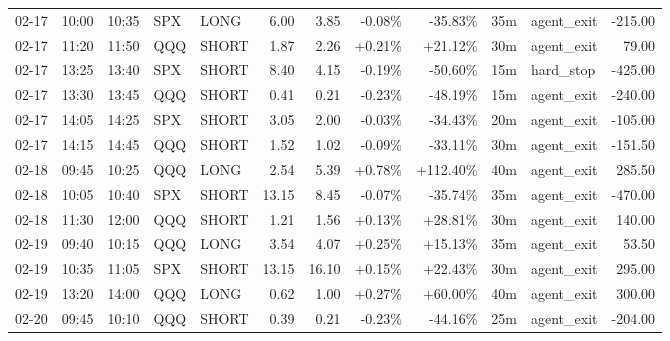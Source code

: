 \documentclass[11pt,a4paper,twoside]{article}
\begin{document}
\begin{center}
\begin{longtable}{>{\color{txtmain}}l l l l l r r r r r >{\color{txtmain}}l r}
02-17 & 10:00 & 10:35 & SPX & LONG & 6.00 & 3.85 & \textcolor{lossred}{-0.08\%} & \textcolor{lossred}{-35.83\%} & 35m & agent\_exit & \textcolor{lossred}{-215.00} \\
02-17 & 11:20 & 11:50 & QQQ & SHORT & 1.87 & 2.26 & \textcolor{wingreen}{+0.21\%} & \textcolor{wingreen}{+21.12\%} & 30m & agent\_exit & \textcolor{wingreen}{79.00} \\
02-17 & 13:25 & 13:40 & SPX & SHORT & 8.40 & 4.15 & \textcolor{lossred}{-0.19\%} & \textcolor{lossred}{-50.60\%} & 15m & hard\_stop & \textcolor{lossred}{-425.00} \\
02-17 & 13:30 & 13:45 & QQQ & SHORT & 0.41 & 0.21 & \textcolor{lossred}{-0.23\%} & \textcolor{lossred}{-48.19\%} & 15m & agent\_exit & \textcolor{lossred}{-240.00} \\
02-17 & 14:05 & 14:25 & SPX & SHORT & 3.05 & 2.00 & \textcolor{lossred}{-0.03\%} & \textcolor{lossred}{-34.43\%} & 20m & agent\_exit & \textcolor{lossred}{-105.00} \\
02-17 & 14:15 & 14:45 & QQQ & SHORT & 1.52 & 1.02 & \textcolor{lossred}{-0.09\%} & \textcolor{lossred}{-33.11\%} & 30m & agent\_exit & \textcolor{lossred}{-151.50} \\
02-18 & 09:45 & 10:25 & QQQ & LONG & 2.54 & 5.39 & \textcolor{wingreen}{+0.78\%} & \textcolor{wingreen}{+112.40\%} & 40m & agent\_exit & \textcolor{wingreen}{285.50} \\
02-18 & 10:05 & 10:40 & SPX & SHORT & 13.15 & 8.45 & \textcolor{lossred}{-0.07\%} & \textcolor{lossred}{-35.74\%} & 35m & agent\_exit & \textcolor{lossred}{-470.00} \\
02-18 & 11:30 & 12:00 & QQQ & SHORT & 1.21 & 1.56 & \textcolor{wingreen}{+0.13\%} & \textcolor{wingreen}{+28.81\%} & 30m & agent\_exit & \textcolor{wingreen}{140.00} \\
02-19 & 09:40 & 10:15 & QQQ & LONG & 3.54 & 4.07 & \textcolor{wingreen}{+0.25\%} & \textcolor{wingreen}{+15.13\%} & 35m & agent\_exit & \textcolor{wingreen}{53.50} \\
02-19 & 10:35 & 11:05 & SPX & SHORT & 13.15 & 16.10 & \textcolor{wingreen}{+0.15\%} & \textcolor{wingreen}{+22.43\%} & 30m & agent\_exit & \textcolor{wingreen}{295.00} \\
02-19 & 13:20 & 14:00 & QQQ & LONG & 0.62 & 1.00 & \textcolor{wingreen}{+0.27\%} & \textcolor{wingreen}{+60.00\%} & 40m & agent\_exit & \textcolor{wingreen}{300.00} \\
02-20 & 09:45 & 10:10 & QQQ & SHORT & 0.39 & 0.21 & \textcolor{lossred}{-0.23\%} & \textcolor{lossred}{-44.16\%} & 25m & agent\_exit & \textcolor{lossred}{-204.00} \\

\end{longtable}
\end{center}
\end{document}
